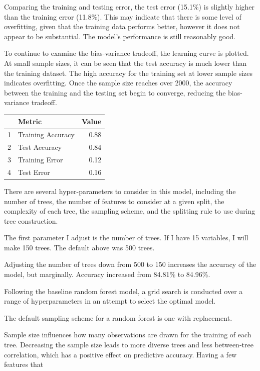 \documentclass[11pt,preprint, authoryear]{elsarticle}
\let\origtable\table
\let\endorigtable\endtable
\renewenvironment{table}[1][2] {
    \expandafter\origtable\expandafter[H]
} {
    \endorigtable
}
\numberwithin{equation}{section}
\numberwithin{figure}{section}
\numberwithin{table}{section}
\begin{document}
Comparing the training and testing error, the test error (15.1\%) is
slightly higher than the training error (11.8\%). This may indicate that
there is some level of overfitting, given that the training data
performs better, however it does not appear to be substantial. The
model's performance is still reasonably good.

To continue to examine the bias-variance tradeoff, the learning curve is
plotted. At small sample sizes, it can be seen that the test accuracy is
much lower than the training dataset. The high accuracy for the training
set at lower sample sizes indicates overfitting. Once the sample size
reaches over 2000, the accuracy between the training and the testing set
begin to converge, reducing the bias-variance tradeoff.

\begin{table}[H]
\centering
\begin{tabular}{rlr}
  \hline
 & Metric & Value \\ 
  \hline
1 & Training Accuracy & 0.88 \\ 
  2 & Test Accuracy & 0.84 \\ 
  3 & Training Error & 0.12 \\ 
  4 & Test Error & 0.16 \\ 
   \hline
\end{tabular}
\caption{More Metrics for Baseline Random Forest \label{tab1}} 
\end{table}

There are several hyper-parameters to consider in this model, including
the number of trees, the number of features to consider at a given
split, the complexity of each tree, the sampling scheme, and the
splitting rule to use during tree construction.

The first parameter I adjust is the number of trees. If I have 15
variables, I will make 150 trees. The default above was 500 trees.

Adjusting the number of trees down from 500 to 150 increases the
accuracy of the model, but marginally. Accuracy increased from 84.81\%
to 84.96\%.

Following the baseline random forest model, a grid search is conducted
over a range of hyperparameters in an attempt to select the optimal
model.

The default sampling scheme for a random forest is one with replacement.

Sample size influences how many observations are drawn for the training
of each tree. Decreasing the sample size leads to more diverse trees and
less between-tree correlation, which has a positive effect on predictive
accuracy. Having a few features that
\end{document}
